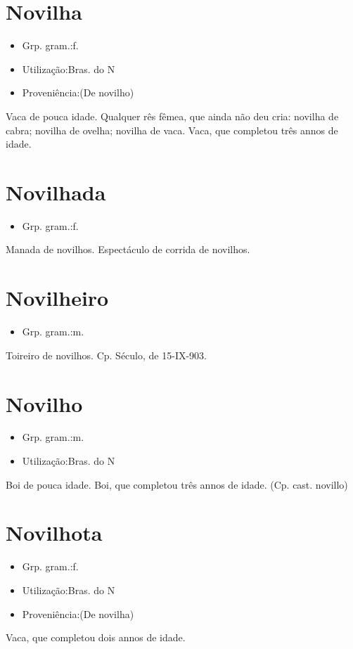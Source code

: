 \section{Novilha}
\begin{itemize}
\item {Grp. gram.:f.}
\end{itemize}
\begin{itemize}
\item {Utilização:Bras. do N}
\end{itemize}
\begin{itemize}
\item {Proveniência:(De \textunderscore novilho\textunderscore )}
\end{itemize}
Vaca de pouca idade.
Qualquer rês fêmea, que ainda não deu cria: \textunderscore novilha de cabra\textunderscore ; \textunderscore novilha de ovelha\textunderscore ; \textunderscore novilha de vaca\textunderscore .
Vaca, que completou três annos de idade.
\section{Novilhada}
\begin{itemize}
\item {Grp. gram.:f.}
\end{itemize}
Manada de novilhos.
Espectáculo de corrida de novilhos.
\section{Novilheiro}
\begin{itemize}
\item {Grp. gram.:m.}
\end{itemize}
Toireiro de novilhos. Cp. \textunderscore Século\textunderscore , de 15-IX-903.
\section{Novilho}
\begin{itemize}
\item {Grp. gram.:m.}
\end{itemize}
\begin{itemize}
\item {Utilização:Bras. do N}
\end{itemize}
Boi de pouca idade.
Boi, que completou três annos de idade.
(Cp. cast. \textunderscore novillo\textunderscore )
\section{Novilhota}
\begin{itemize}
\item {Grp. gram.:f.}
\end{itemize}
\begin{itemize}
\item {Utilização:Bras. do N}
\end{itemize}
\begin{itemize}
\item {Proveniência:(De \textunderscore novilha\textunderscore )}
\end{itemize}
Vaca, que completou dois annos de idade.

